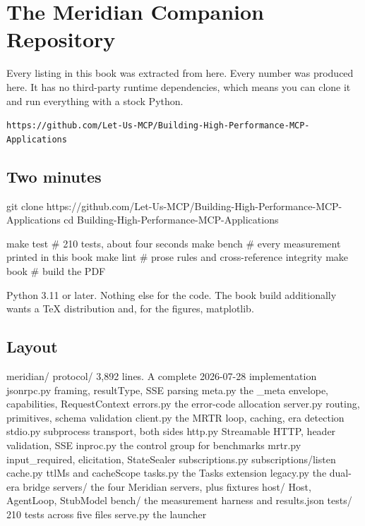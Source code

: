 \chapter{The Meridian Companion Repository}
\label{ch:companion}

Every listing in this book was extracted from here. Every number was produced
here. It has no third-party runtime dependencies, which means you can clone it
and run everything with a stock Python.

\begin{center}
\texttt{https://github.com/Let-Us-MCP/Building-High-Performance-MCP-Applications}
\end{center}

\section{Two minutes}

\begin{sh}
git clone https://github.com/Let-Us-MCP/Building-High-Performance-MCP-Applications
cd Building-High-Performance-MCP-Applications

make test      # 210 tests, about four seconds
make bench     # every measurement printed in this book
make lint      # prose rules and cross-reference integrity
make book      # build the PDF
\end{sh}

Python 3.11 or later. Nothing else for the code. The book build additionally
wants a TeX distribution and, for the figures, matplotlib.

\section{Layout}

\begin{plain}
meridian/
  protocol/          3,892 lines. A complete 2026-07-28 implementation
    jsonrpc.py         framing, resultType, SSE parsing
    meta.py            the _meta envelope, capabilities, RequestContext
    errors.py          the error-code allocation
    server.py          routing, primitives, schema validation
    client.py          the MRTR loop, caching, era detection
    stdio.py           subprocess transport, both sides
    http.py            Streamable HTTP, header validation, SSE
    inproc.py          the control group for benchmarks
    mrtr.py            input_required, elicitation, StateSealer
    subscriptions.py   subscriptions/listen
    cache.py           ttlMs and cacheScope
    tasks.py           the Tasks extension
    legacy.py          the dual-era bridge
  servers/           the four Meridian servers, plus fixtures
  host/              Host, AgentLoop, StubModel
  bench/             the measurement harness and results.json
  tests/             210 tests across five files
  serve.py           the launcher
\end{plain}

